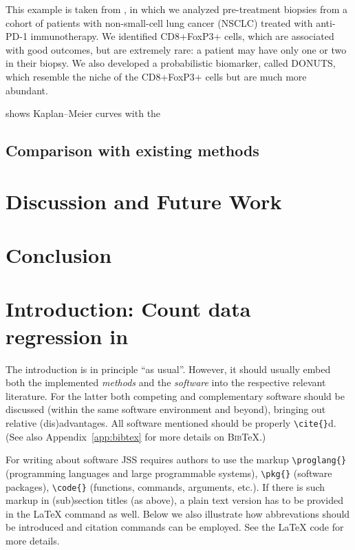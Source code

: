 \documentclass[article]{jss}
\begin{document}
This example is taken from \citep{AstroPathLung}, in which we analyzed pre-treatment biopsies from a cohort of patients with non-small-cell lung cancer (NSCLC) treated with anti-PD-1 immunotherapy.  We identified CD8+FoxP3+ cells, which are associated with good outcomes, but are extremely rare: a patient may have only one or two in their biopsy.  We also developed a probabilistic biomarker, called DONUTS, which resemble the niche of the CD8+FoxP3+ cells but are much more abundant.

 shows Kaplan--Meier curves with the

\subsection{Comparison with existing methods}

\section{Discussion and Future Work}

\section{Conclusion}

\section[Introduction: Count data regression in R]{Introduction: Count data regression in } \label{sec:intro}

\begin{leftbar}
The introduction is in principle ``as usual''. However, it should usually embed
both the implemented \emph{methods} and the \emph{software} into the respective
relevant literature. For the latter both competing and complementary software
should be discussed (within the same software environment and beyond), bringing
out relative (dis)advantages. All software mentioned should be properly
\verb|\cite{}|d. (See also Appendix~\ref{app:bibtex} for more details on
\textsc{Bib}{\TeX}.)

For writing about software JSS requires authors to use the markup
\verb|\proglang{}| (programming languages and large programmable systems),
\verb|\pkg{}| (software packages), \verb|\code{}| (functions, commands,
arguments, etc.). If there is such markup in (sub)section titles (as above), a
plain text version has to be provided in the {\LaTeX} command as well. Below we
also illustrate how abbrevations should be introduced and citation commands can
be employed. See the {\LaTeX} code for more details.
\end{leftbar}
\end{document}
